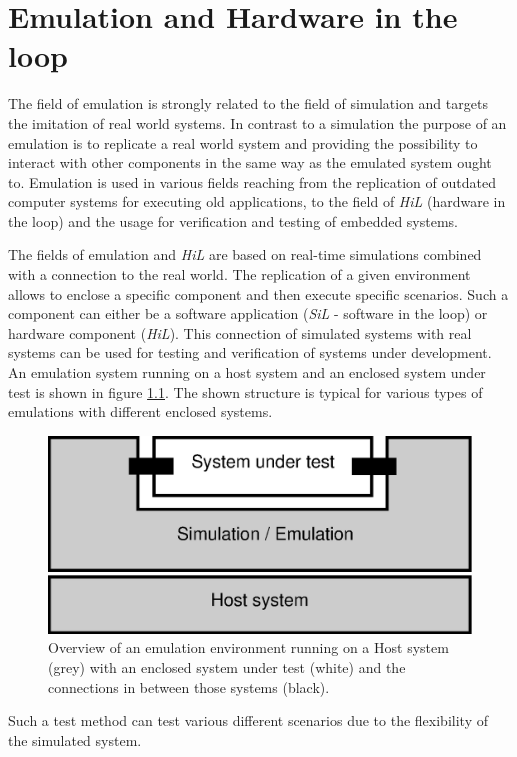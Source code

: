 \chapter{Emulation and Hardware in the loop}
\label{cha:emulation}

The field of emulation is strongly related to the field of simulation and targets the imitation of real world systems.
In contrast to a simulation the purpose of an emulation is to replicate a real world system and providing the possibility to interact with other components in the same way as the emulated system ought to.
Emulation is used in various fields reaching from the replication of outdated computer systems for executing old applications, to the field of \emph{HiL} (hardware in the loop) and the usage for verification and testing of embedded systems. \cite{emulation_koninklijke}

The fields of emulation and \emph{HiL} are based on real-time simulations combined with a connection to the real world.
The replication of a given environment allows to enclose a specific component and then execute specific scenarios.
Such a component can either be a software application (\emph{SiL} - software in the loop) or hardware component (\emph{HiL}).
This connection of simulated systems with real systems can be used for testing and verification of systems under development.
An emulation system running on a host system and an enclosed system under test is shown in figure \ref{fig:emulation_overview}.
The shown structure is typical for various types of emulations with different enclosed systems.

\begin{figure}
\centering
\includegraphics[width=0.7\linewidth]{images/emulation_overview}
\caption{Overview of an emulation environment running on a Host system (grey) with an enclosed system under test (white) and the connections in between those systems (black).}
\label{fig:emulation_overview}
\end{figure}



Such a test method can test various different scenarios due to the flexibility of the simulated system.
\cite[section I]{lu_low-cost_2007}

